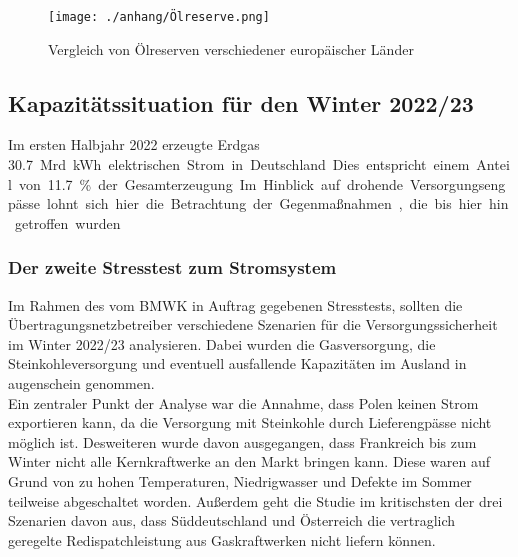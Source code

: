 			\begin{figure}[H]
				\centering
				\texttt{[image: ./anhang/Ölreserve.png]}
				\caption{Vergleich von Ölreserven verschiedener europäischer Länder}
				\label{Abb. Strategische Ölreserve}
			\end{figure}
		
		
	\subsection{Kapazitätssituation für den Winter 2022/23}
	Im ersten Halbjahr 2022 erzeugte Erdgas \SI{30,7} Mrd. {kWh} elektrischen Strom in Deutschland. Dies entspricht einem Anteil von \SI{11,7}{\percent} der Gesamterzeugung. Im Hinblick auf drohende Versorgungsengpässe lohnt sich hier die Betrachtung der Gegenmaßnahmen, die bis hier hin getroffen wurden. \\
	
		\subsubsection{Der zweite Stresstest zum Stromsystem}
		Im Rahmen des vom BMWK in Auftrag gegebenen Stresstests, sollten die Übertragungsnetzbetreiber verschiedene Szenarien für die Versorgungssicherheit im Winter 2022/23 analysieren. Dabei wurden die Gasversorgung, die Steinkohleversorgung und eventuell ausfallende Kapazitäten im Ausland in augenschein genommen.\\
		
		Ein zentraler Punkt der Analyse war die Annahme, dass Polen keinen Strom exportieren kann, da die Versorgung mit Steinkohle durch Lieferengpässe nicht möglich ist. Desweiteren wurde davon ausgegangen, dass Frankreich bis zum Winter nicht alle Kernkraftwerke an den Markt bringen kann. Diese waren auf Grund von zu hohen Temperaturen, Niedrigwasser und Defekte im Sommer teilweise abgeschaltet worden. Außerdem geht die Studie im kritischsten der drei Szenarien davon aus, dass Süddeutschland und Österreich die vertraglich geregelte Redispatchleistung aus Gaskraftwerken nicht liefern können. \\
		
